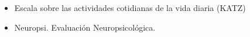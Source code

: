\begin{itemize}
\item {Escala sobre las actividades cotidianas de la vida diaria (KATZ)} 
\cite{Roumec14}

\item {Neuropsi. Evaluaci\'on Neuropsicol\'ogica.} \cite{Solis03}

\end{itemize}

